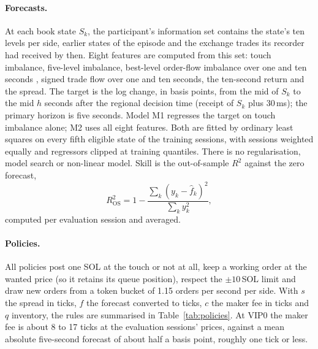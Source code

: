 \documentclass[11pt]{article}
\newcommand{\Rsq}{R^2_{\mathrm{OS}}}
\begin{document}
\paragraph{Forecasts.} At each book state $S_k$, the participant's information set contains the state's ten levels per
side, earlier states of the episode and the exchange trades its recorder had received by then. Eight features are
computed from this set: touch imbalance, five-level imbalance, best-level order-flow imbalance over one and ten seconds
\citep{cont2014}, signed trade flow over one and ten seconds, the ten-second return and the spread. The target is the
log change, in basis points, from the mid of $S_k$ to the mid $h$ seconds after the regional decision time (receipt of
$S_k$ plus 30\,ms); the primary horizon is five seconds. Model M1 regresses
the target on touch imbalance alone; M2 uses all eight features. Both are fitted by ordinary least squares on every fifth
eligible state of the training sessions, with sessions weighted equally and regressors clipped at training quantiles.
There is no regularisation, model search or non-linear model. Skill is the out-of-sample $R^2$ against the zero forecast,
\begin{equation}
  \Rsq = 1 - \frac{\sum_k (y_k - \hat f_k)^2}{\sum_k y_k^2},
\end{equation}
computed per evaluation session and averaged.

\paragraph{Policies.} All policies post one SOL at the touch or not at all, keep a working order at the wanted price (so
it retains its queue position), respect the $\pm10$\,SOL limit and draw new orders from a token bucket of 1.15 orders per
second per side. With $s$ the spread in ticks, $f$ the forecast converted to ticks, $c$ the maker fee in ticks and $q$
inventory, the rules are summarised in Table~\ref{tab:policies}. At VIP0 the maker fee is about 8 to 17 ticks at the
evaluation sessions' prices, against a mean absolute five-second forecast of about half a basis point, roughly one tick
or less.
\end{document}

